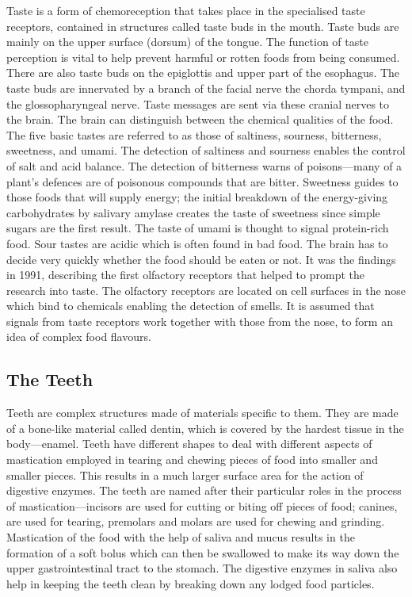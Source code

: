 Taste is a form of chemoreception that takes place in the specialised taste receptors, contained in structures called taste buds in the mouth. Taste buds are mainly on the upper surface (dorsum) of the tongue. The function of taste perception is vital to help prevent harmful or rotten foods from being consumed. There are also taste buds on the epiglottis and upper part of the esophagus. The taste buds are innervated by a branch of the facial nerve the chorda tympani, and the glossopharyngeal nerve. Taste messages are sent via these cranial nerves to the brain. The brain can distinguish between the chemical qualities of the food. The five basic tastes are referred to as those of saltiness, sourness, bitterness, sweetness, and umami. The detection of saltiness and sourness enables the control of salt and acid balance. The detection of bitterness warns of poisons---many of a plant's defences are of poisonous compounds that are bitter. Sweetness guides to those foods that will supply energy; the initial breakdown of the energy-giving carbohydrates by salivary amylase creates the taste of sweetness since simple sugars are the first result. The taste of umami is thought to signal protein-rich food. Sour tastes are acidic which is often found in bad food. The brain has to decide very quickly whether the food should be eaten or not. It was the findings in 1991, describing the first olfactory receptors that helped to prompt the research into taste. The olfactory receptors are located on cell surfaces in the nose which bind to chemicals enabling the detection of smells. It is assumed that signals from taste receptors work together with those from the nose, to form an idea of complex food flavours.

\hypertarget{the-teeth}{%
\subsection{The Teeth}\label{the-teeth}}

Teeth are complex structures made of materials specific to them. They are made of a bone-like material called dentin, which is covered by the hardest tissue in the body---enamel. Teeth have different shapes to deal with different aspects of mastication employed in tearing and chewing pieces of food into smaller and smaller pieces. This results in a much larger surface area for the action of digestive enzymes. The teeth are named after their particular roles in the process of mastication---incisors are used for cutting or biting off pieces of food; canines, are used for tearing, premolars and molars are used for chewing and grinding. Mastication of the food with the help of saliva and mucus results in the formation of a soft bolus which can then be swallowed to make its way down the upper gastrointestinal tract to the stomach. The digestive enzymes in saliva also help in keeping the teeth clean by breaking down any lodged food particles.


